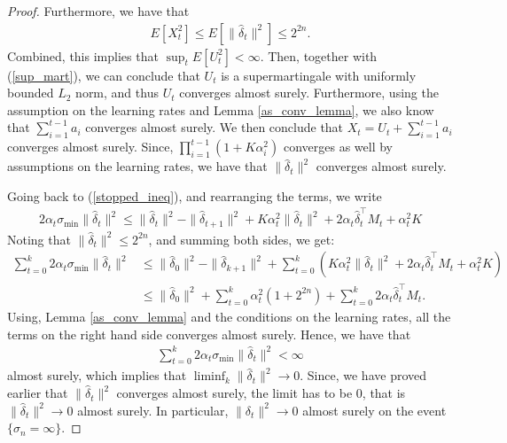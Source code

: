 \documentclass[11pt]{article}
\begin{document}
\begin{proof}
Furthermore, we have that 
\begin{align*}
E[X_t^2] \leq E[\|\hat{\delta}_t\|^2] \leq 2^{2n}.
\end{align*}
Combined, this implies that 
$
\sup_tE[U_t^2]<\infty.
$
Then, together with (\ref{sup_mart}), we can conclude that $U_t$ is a supermartingale with uniformly bounded $L_2$ norm, and thus $U_t$ converges almost surely. Furthermore, using the assumption on the learning rates and Lemma \ref{as_conv_lemma}, we also know that $\sum_{i=1}^{t-1} a_i$ converges almost surely. We then conclude that $X_t = U_t + \sum_{i=1}^{t-1} a_i$ converges almost surely. Since, $\prod_{i=1}^{t-1}(1+K\alpha_i^2)$ converges as well by assumptions on the learning rates, we have that 
$
\|\hat{\delta}_t\|^2
$ converges almost surely.

Going back to (\ref{stopped_ineq}), and rearranging the terms, we write
\begin{align*}
2\alpha_t \sigma_{\min}\|\hat{\delta}_t\|^2 \leq \|\hat{\delta}_t\|^2 -\|\hat{\delta}_{t+1}\|^2 + K\alpha_t^2\|\hat{\delta}_t\|^2 + 2\alpha_t \hat{\delta}^\intercal_t M_t + \alpha_t^2 K
\end{align*}
Noting that $\|\hat{\delta}_t\|^2\leq 2^{2n}$, and summing both sides, we get:
\begin{align*}
\sum_{t=0}^k 2\alpha_t \sigma_{\min}\|\hat{\delta}_t\|^2 &\leq \|\hat{\delta}_0\|^2 - \|\hat{\delta}_{k+1}\|^2+ \sum_{t=0}^k \left(K\alpha_t^2\|\hat{\delta}_t\|^2 + 2\alpha_t \hat{\delta}^\intercal_t M_t + \alpha_t^2 K\right)\\
&\leq \|\hat{\delta}_0\|^2 +  \sum_{t=0}^k \alpha_t^2 (1+ 2^{2n}) +  \sum_{t=0}^k  2\alpha_t \hat{\delta}^\intercal_t M_t.
\end{align*}
Using, Lemma \ref{as_conv_lemma} and the conditions on the learning rates, all the terms on the right hand side converges almost surely. Hence, we have that 
\begin{align*}
\sum_{t=0}^k 2\alpha_t \sigma_{\min}\|\hat{\delta}_t\|^2  <\infty
\end{align*}
almost surely, which implies that $\liminf_k \|\hat{\delta}_t\|^2 \to 0$. Since, we have proved earlier that $\|\hat{\delta}_t\|^2$ converges almost surely, the limit has to be 0, that is $\|\hat{\delta}_t\|^2\to 0$ almost surely. In particular, $\|{\delta}_t\|^2\to 0$ almost surely on the event $\{\sigma_n=\infty\}$.


\end{proof}
\end{document}
